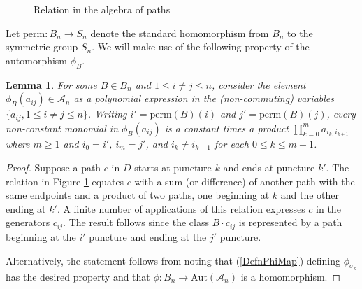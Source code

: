 \documentclass[11pt]{amsart}
\def\A{{\mathcal A}}
\def\s{{\sigma}}
\newtheorem{lem}[thm]{Lemma}
\begin{document}
  \begin{figure}[ht]
\caption{Relation in the algebra of paths}
\label{FigRelnPathAlg}
\end{figure}
  
  Let $\text{perm}:B_n\to S_n$ denote the standard homomorphism from $B_n$ to the symmetric group $S_n$. We will make use of the following property of the automorphism $\phi_B$.

  \begin{lem} For some $B\in B_n$ and $1\le i\ne j\le n$, consider the element $\phi_B(a_{ij})\in \A_n$ as a polynomial expression in the (non-commuting) variables $\{a_{ij}, 1\le i\ne j\le n\}$. Writing $i'=\text{perm}(B)(i)$ and $j' = \text{perm}(B)(j)$, every non-constant monomial in $\phi_B(a_{ij})$ is a constant times a product $\prod_{k=0}^m a_{i_k,i_{k+1}}$ where $m\ge 1$ and $i_0=i'$, $i_m=j'$, and $i_k\ne i_{k+1}$ for each $0\le k\le m-1$.
  \label{lem:monomial}
  \end{lem}
  \begin{proof}Suppose a path $c$ in $D$ starts at puncture $k$ and ends at puncture $k'$. The relation in Figure \ref{FigRelnPathAlg} equates $c$ with a sum (or difference) of another path with the same endpoints and a product of two paths, one beginning at $k$ and the other ending at $k'$. A finite number of applications of this relation expresses $c$ in the generators $c_{ij}$. The result follows since the class $B\cdot c_{ij}$ is represented by a path beginning at the $i'$ puncture and ending at the $j'$ puncture.

  Alternatively, the statement follows from noting that (\ref{DefnPhiMap}) defining $\phi_{\s_k}$ has the desired property and that $\phi:B_n\to\text{Aut}(\A_n)$ is a homomorphism.
  \end{proof}
\end{document}
